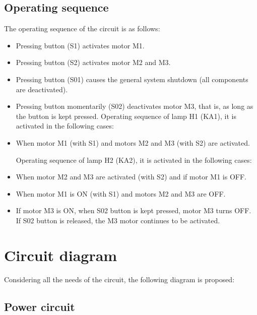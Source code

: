 \documentclass[runningheads]{llncs}
\begin{document}
\subsection{Operating sequence}

The operating sequence of the circuit is as follows:

\begin{itemize}
    \item Pressing button (S1) activates motor M1.
    \item Pressing button (S2) activates motor M2 and M3.
    \item Pressing button (S01) causes the general system shutdown (all components
          are deactivated).
    \item  Pressing button momentarily (S02) deactivates motor M3, that is, as long as
          the button is kept pressed.
          Operating sequence of lamp H1 (KA1), it is activated in the following cases:
    \item  When motor M1 (with S1) and motors M2 and M3 (with S2) are activated.

          Operating sequence of lamp H2 (KA2), it is activated in the following cases:
    \item When motor M2 and M3 are activated (with S2) and if motor M1 is OFF.
    \item  When motor M1 is ON (with S1) and motors M2 and M3 are OFF.
    \item If motor M3 is ON, when S02 button is kept pressed, motor M3 turns OFF. If S02
          button is released, the M3 motor continues to be activated.
\end{itemize}

\newpage

\section{Circuit diagram}
Considering all the needs of the circuit, the following diagram is proposed:
\subsection{Power circuit}
\end{document}
